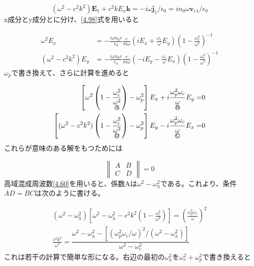 \documentclass{ltjsarticle}
\numberwithin{equation}{section} %
\newcommand{\ctext}[1]{\raise0.2ex\hbox{\textcircled{\scriptsize{#1}}}}
\begin{document}
\begin{equation}
  (\omega^2 - c^2k^2)\bm{E}_1 + c^2kE_x\bm{k} = - i\omega\bm{j}_1/\epsilon_0 = in_0\omega\bm{v}_{e1}/\epsilon_0 \label{4.99}
\end{equation}
x成分とy成分とに分け、\eqref{4.98}式を用いると

\begin{equation}
  \begin{aligned}
    \omega^2E_x &= -\frac{i\omega n_0e}{\epsilon_0}\frac{e}{m\omega}\left(iE_x + \frac{\omega_c}{\omega}E_y\right)\left(1 - \frac{\omega^2_c}{\omega^2}\right)^{-1}\\
    (\omega^2 - c^2k^2)E_y &= -\frac{i\omega n_0e}{\epsilon_0}\frac{e}{m\omega}\left(-iE_y - \frac{\omega_c}{\omega}E_x\right)\left(1 - \frac{\omega^2_c}{\omega^2}\right)^{-1}
  \end{aligned} \label{4.100}
\end{equation}
$\omega_p$で書き換えて、さらに計算を進めると

\begin{equation}
  \begin{aligned}
    \left[\omega^2\left(1-\underset{\text{\ctext{A}}}{\frac{\omega_c^2}{\omega^2}}\right) - \omega^2_p\right]E_x + i\underset{\text{\ctext{B}}}{\frac{\omega^2_p \omega_c}{\omega}}E_y = &0\\
    \left[(\omega^2 - c^2k^2)\left(1-\underset{\text{\ctext{D}}}{\frac{\omega_c^2}{\omega^2}}\right) - \omega^2_p\right]E_y - i\underset{\text{\ctext{C}}}{\frac{\omega^2_p \omega_c}{\omega}}E_x = &0
  \end{aligned} \label{4.101}
\end{equation}
これらが意味のある解をもつためには

\begin{equation}
  \begin{Vmatrix}
   A & B \\
   C & D
  \end{Vmatrix} = 0 \label{4.102}
\end{equation}
高域混成周波数\eqref{4.60}を用いると、係数Aは$\omega^2 - \omega^2_h$である。これより、条件 $AD = BC$は次のように書ける。

\begin{equation}
  \begin{aligned}
    (\omega^2 - \omega^2_h)\left[\omega^2 - \omega^2_h - c^2k^2\left(1 - \frac{\omega^2_c}{\omega^2}\right)\right] = \left(\frac{\omega^2_p \omega_c}{\omega}\right)^2\\
    \frac{c^2k^2}{\omega^2} = \dfrac{\omega^2 - \omega^2_h - \left[(\omega^2_p \omega_c/\omega)^2 / (\omega^2 - \omega^2_h)\right]}{\omega^2 - \omega^2_c}
  \end{aligned} \label{4.103}
\end{equation}
これは若干の計算で簡単な形になる。右辺の最初の$\omega^2_h$を$\omega^2_c + \omega^2_p$で書き換えると
\end{document}
